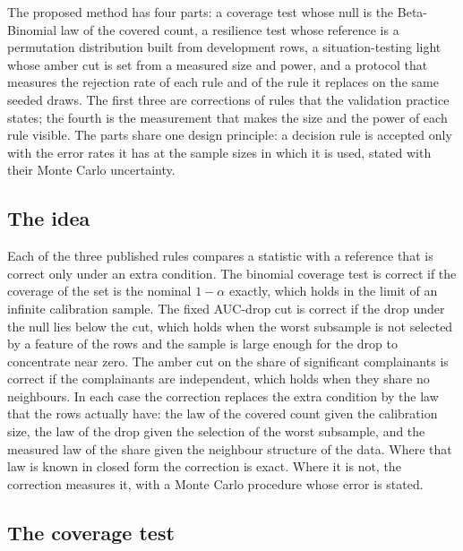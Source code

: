 The proposed method has four parts: a coverage test whose null is the Beta-Binomial law of the covered count, a resilience test whose reference is a permutation distribution built from development rows, a situation-testing light whose amber cut is set from a measured size and power, and a protocol that measures the rejection rate of each rule and of the rule it replaces on the same seeded draws. The first three are corrections of rules that the validation practice states; the fourth is the measurement that makes the size and the power of each rule visible. The parts share one design principle: a decision rule is accepted only with the error rates it has at the sample sizes in which it is used, stated with their Monte Carlo uncertainty.

\subsection{The idea}

Each of the three published rules compares a statistic with a reference that is correct only under an extra condition. The binomial coverage test is correct if the coverage of the set is the nominal $1-\alpha$ exactly, which holds in the limit of an infinite calibration sample. The fixed AUC-drop cut is correct if the drop under the null lies below the cut, which holds when the worst subsample is not selected by a feature of the rows and the sample is large enough for the drop to concentrate near zero. The amber cut on the share of significant complainants is correct if the complainants are independent, which holds when they share no neighbours. In each case the correction replaces the extra condition by the law that the rows actually have: the law of the covered count given the calibration size, the law of the drop given the selection of the worst subsample, and the measured law of the share given the neighbour structure of the data. Where that law is known in closed form the correction is exact. Where it is not, the correction measures it, with a Monte Carlo procedure whose error is stated.

\subsection{The coverage test}

